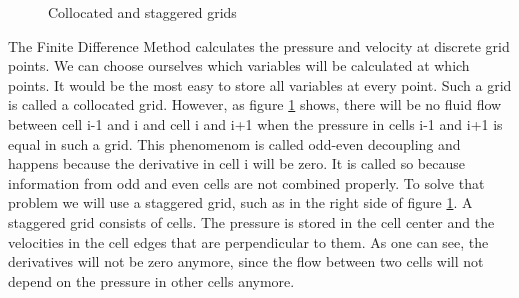 \documentclass{article}
\begin{document}
\begin{figure}[h]
\centering
{} \caption{Collocated and staggered grids} \label{Odd-even decoupling} \end{figure}
The Finite Difference Method calculates the pressure and velocity at discrete grid points. We can choose ourselves which variables will be calculated at which points. It would be the most easy to store all variables at every point. Such a grid is called a collocated grid\cite{Staggered grid}. However, as figure \ref{Odd-even decoupling} shows, there will be no fluid flow between cell i-1 and i and cell i and i+1 when the pressure in cells i-1 and i+1 is equal in such a grid. This phenomenom is called odd-even decoupling and happens because the derivative in cell i will be zero\cite{Staggered grid}. It is called so because information from odd and even cells are not combined properly\cite{Staggered grid}. To solve that problem we will use a staggered grid, such as in the right side of figure \ref{Odd-even decoupling}. A staggered grid consists of cells. The pressure is stored in the cell center and the velocities in the cell edges that are perpendicular to them\cite{Staggered grid}. As one can see, the derivatives will not be zero anymore, since the flow between two cells will not depend on the pressure in other cells anymore.
\newpage
\end{document}
